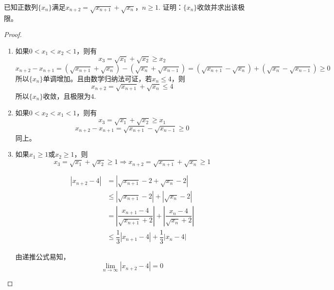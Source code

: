\begin{proposition}
    
    已知正数列$\{x_n\}$满足$x_{n + 2} = \sqrt{x_{n + 1}} + \sqrt{x_{n}}$，$n \geq 1$. 证明：$\{x_n\}$收敛并求出该极限。

\end{proposition}

\begin{proof}

    \begin{enumerate}

        \item 
            如果$0 < x_1 < x_2 < 1$，则有
            \[x_3 = \sqrt{x_1} + \sqrt{x_2} \geq x_2\]
            \[x_{n + 2} - x_{n + 1} = (\sqrt{x_{n + 1}} + \sqrt{x_{n}}) - (\sqrt{x_{n}} + \sqrt{x_{n - 1}}) = (\sqrt{x_{n + 1}} - \sqrt{x_{n}}) + (\sqrt{x_{n}} - \sqrt{x_{n - 1}}) \geq 0\]
            所以$\{x_n\}$单调增加。且由数学归纳法可证，若$x_n \leq 4$，则
            \[x_{n + 2} = \sqrt{x_{n + 1}} + \sqrt{x_{n}} \leq 4\]
            所以$\{x_n\}$收敛，且极限为$4$.

        \item 
            如果$0 < x_2 < x_1 < 1$，则有
            \[x_3 = \sqrt{x_1} + \sqrt{x_2} \geq x_1\]
            \[x_{n + 2} - x_{n + 1} = \sqrt{x_{n + 1}} - \sqrt{x_{n - 1}} \geq 0\]
            同上。

        \item 
            如果$x_1 \geq 1$或$x_2 \geq 1$，则
            \[x_3 = \sqrt{x_1} + \sqrt{x_2} \geq 1 \Longrightarrow x_{n + 2} = \sqrt{x_{n + 1}} + \sqrt{x_{n}} \geq 1\]
            
            \begin{align*}
                |x_{n + 2} - 4| & = |\sqrt{x_{n + 1}} - 2 + \sqrt{x_{n}} - 2| \\
                & \leq |\sqrt{x_{n + 1}} - 2| + |\sqrt{x_{n}} - 2| \\
                & = \left| \dfrac{x_{n + 1} - 4}{\sqrt{x_{n + 1}} + 2} \right| + \left| \dfrac{x_{n} - 4}{\sqrt{x_{n}} + 2} \right| \\
                & \leq \dfrac{1}{3} |x_{n + 1} - 4| + \dfrac{1}{3}|x_n - 4| 
            \end{align*}

            由递推公式易知，
            \[\lim\limits_{n \to \infty}{|x_{n + 2} - 4|} = 0\]

    \end{enumerate}

\end{proof}

